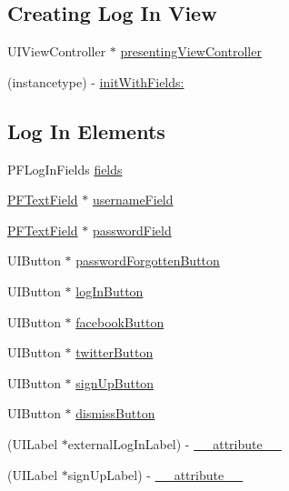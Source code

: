 \subsection*{Creating Log In View}
\label{_amgrpc8428f71b0802c997724718279eeb751}%


 

 \begin{DoxyCompactItemize}
\item 
U\+I\+View\+Controller $\ast$ \hyperlink{interface_p_f_log_in_view_a9743c6a9acbb86749fe2dc6d50447552}{presenting\+View\+Controller}
\item 
(instancetype) -\/ \hyperlink{interface_p_f_log_in_view_a527a65d9bc4429e6314768e3f88e0ef8}{init\+With\+Fields\+:}
\end{DoxyCompactItemize}
\subsection*{Log In Elements}
\label{_amgrp823f7d999d5c3ea6783fa4e2c28a8de4}%


 

 \begin{DoxyCompactItemize}
\item 
P\+F\+Log\+In\+Fields \hyperlink{interface_p_f_log_in_view_a57c9766d511bca34b7f75fd4bd25a63d}{fields}
\item 
\hyperlink{interface_p_f_text_field}{P\+F\+Text\+Field} $\ast$ \hyperlink{interface_p_f_log_in_view_af6c5b3c59071b1c79442f4781f703ad2}{username\+Field}
\item 
\hyperlink{interface_p_f_text_field}{P\+F\+Text\+Field} $\ast$ \hyperlink{interface_p_f_log_in_view_af2a3676f5d1bfaa67de4b48a6bd358b7}{password\+Field}
\item 
U\+I\+Button $\ast$ \hyperlink{interface_p_f_log_in_view_a15c2c32b5a78348e75399cedb99b6968}{password\+Forgotten\+Button}
\item 
U\+I\+Button $\ast$ \hyperlink{interface_p_f_log_in_view_afcadd6b2ccea1a5f06cd82c79dd675f0}{log\+In\+Button}
\item 
U\+I\+Button $\ast$ \hyperlink{interface_p_f_log_in_view_afbed9acbbd4acf185fce057ab640ab23}{facebook\+Button}
\item 
U\+I\+Button $\ast$ \hyperlink{interface_p_f_log_in_view_a831da16d37f7dc63b2d37d198eaafba0}{twitter\+Button}
\item 
U\+I\+Button $\ast$ \hyperlink{interface_p_f_log_in_view_aca49da3d4d6b0e7aa6264953dc74f47a}{sign\+Up\+Button}
\item 
U\+I\+Button $\ast$ \hyperlink{interface_p_f_log_in_view_a24ee18ef9ab5fe8f9e5e70e9dfd77627}{dismiss\+Button}
\item 
(U\+I\+Label $\ast$external\+Log\+In\+Label) -\/ \hyperlink{interface_p_f_log_in_view_afff2ef2f219c539b4a810564faa5a1ed}{\+\_\+\+\_\+attribute\+\_\+\+\_\+}
\item 
(U\+I\+Label $\ast$sign\+Up\+Label) -\/ \hyperlink{interface_p_f_log_in_view_a9397b636bd66bd2a348950d932c89fe6}{\+\_\+\+\_\+attribute\+\_\+\+\_\+}
\end{DoxyCompactItemize}


